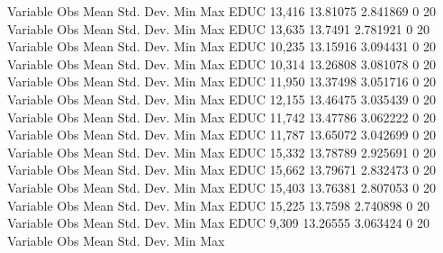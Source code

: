 {\smallskip}
    Variable {\VBAR}        Obs        Mean    Std. Dev.       Min        Max
        EDUC {\VBAR}     13,416    13.81075    2.841869          0         20
{\smallskip}
    Variable {\VBAR}        Obs        Mean    Std. Dev.       Min        Max
        EDUC {\VBAR}     13,635     13.7491    2.781921          0         20
{\smallskip}
    Variable {\VBAR}        Obs        Mean    Std. Dev.       Min        Max
        EDUC {\VBAR}     10,235    13.15916    3.094431          0         20
{\smallskip}
    Variable {\VBAR}        Obs        Mean    Std. Dev.       Min        Max
        EDUC {\VBAR}     10,314    13.26808    3.081078          0         20
{\smallskip}
    Variable {\VBAR}        Obs        Mean    Std. Dev.       Min        Max
        EDUC {\VBAR}     11,950    13.37498    3.051716          0         20
{\smallskip}
    Variable {\VBAR}        Obs        Mean    Std. Dev.       Min        Max
        EDUC {\VBAR}     12,155    13.46475    3.035439          0         20
{\smallskip}
    Variable {\VBAR}        Obs        Mean    Std. Dev.       Min        Max
        EDUC {\VBAR}     11,742    13.47786    3.062222          0         20
{\smallskip}
    Variable {\VBAR}        Obs        Mean    Std. Dev.       Min        Max
        EDUC {\VBAR}     11,787    13.65072    3.042699          0         20
{\smallskip}
    Variable {\VBAR}        Obs        Mean    Std. Dev.       Min        Max
        EDUC {\VBAR}     15,332    13.78789    2.925691          0         20
{\smallskip}
    Variable {\VBAR}        Obs        Mean    Std. Dev.       Min        Max
        EDUC {\VBAR}     15,662    13.79671    2.832473          0         20
{\smallskip}
    Variable {\VBAR}        Obs        Mean    Std. Dev.       Min        Max
        EDUC {\VBAR}     15,403    13.76381    2.807053          0         20
{\smallskip}
    Variable {\VBAR}        Obs        Mean    Std. Dev.       Min        Max
        EDUC {\VBAR}     15,225     13.7598    2.740898          0         20
{\smallskip}
    Variable {\VBAR}        Obs        Mean    Std. Dev.       Min        Max
        EDUC {\VBAR}      9,309    13.26555    3.063424          0         20
{\smallskip}
    Variable {\VBAR}        Obs        Mean    Std. Dev.       Min        Max
